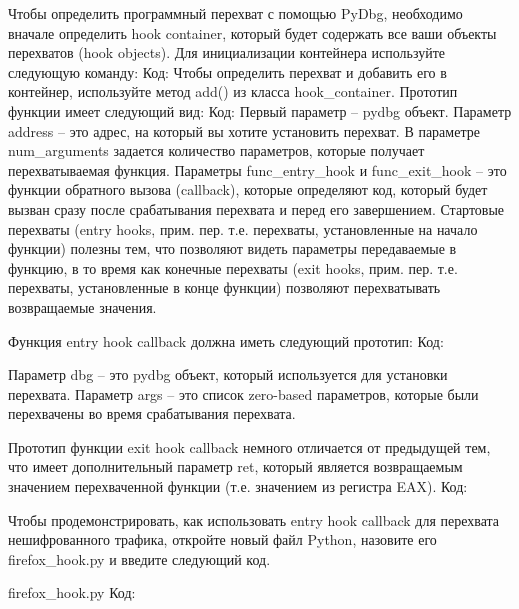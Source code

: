 \documentclass[12pt]{book}
\begin{document}
Чтобы определить программный перехват с помощью PyDbg, необходимо вначале определить hook container, который будет содержать все ваши объекты перехватов (hook objects). Для инициализации контейнера используйте следующую команду:
Код:
Чтобы определить перехват и добавить его в контейнер, используйте метод add() из класса hook\_container. Прототип функции имеет следующий вид:
Код:
Первый параметр – pydbg объект. Параметр address – это адрес, на который вы хотите установить перехват. В параметре num\_arguments задается количество параметров, которые получает перехватываемая функция. Параметры func\_entry\_hook и func\_exit\_hook – это функции обратного вызова (callback), которые определяют код, который будет вызван сразу после срабатывания перехвата и перед его завершением. Стартовые перехваты (entry hooks, прим. пер. т.е. перехваты, установленные на начало функции) полезны тем, что позволяют видеть параметры передаваемые в функцию, в то время как конечные перехваты (exit hooks, прим. пер. т.е. перехваты, установленные в конце функции) позволяют перехватывать возвращаемые значения. 

Функция entry hook callback должна иметь следующий прототип:
Код:
    

Параметр dbg – это pydbg объект, который используется для установки перехвата. Параметр args – это список zero-based параметров, которые были перехвачены во время срабатывания перехвата.

Прототип функции exit hook callback немного отличается от предыдущей тем, что имеет дополнительный параметр ret, который является возвращаемым значением перехваченной функции (т.е. значением из регистра EAX).
Код:
    

Чтобы продемонстрировать, как использовать entry hook callback для перехвата нешифрованного трафика, откройте новый файл Python, назовите его firefox\_hook.py и введите следующий код.

firefox\_hook.py
Код:



\end{document}
